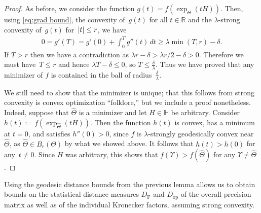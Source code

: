 \documentclass[aos]{imsart}
\theoremstyle{definition}
\numberwithin{equation}{section}
\DeclarePairedDelimiter{\abs}{\lvert}{\rvert}
\newcommand{\R}{{\mathbb{R}}}
\renewcommand{\H}{{\mathbb{H}}}
\newcommand{\htheta}{\widehat{\Theta}}
\newcommand{\DF}{D_{\operatorname{F}}}
\newcommand{\Dop}{D_{\operatorname{op}}}
\begin{document}
\begin{proof}
As before, we consider the function $g(t) = f(\exp_\Theta(tH))$.
Then, using \cref{eq:grad bound}, the convexity of~$g(t)$ for all $t\in\R$ and the $\lambda$-strong convexity of~$g(t)$ for~$\abs t \leq  r$, we have
\begin{align*}
  0 = g'(T) = g'(0) + \int_0^T g''(t) \, dt \geq \lambda \min(T,  r) - \delta.
\end{align*}
If $T> r$ then we have a contradiction as $\lambda r - \delta > \lambda r/2 - \delta > 0$.
Therefore we must have~$T\leq r$ and hence $\lambda T - \delta \leq 0$, so $T \leq \frac\delta\lambda$.
Thus we have proved that any minimizer of $f$ is contained in the ball of radius~$\frac\delta\lambda$.

We still need to show that the minimizer is unique; that this follows from strong convexity is convex optimization ``folklore,'' but we include a proof nonetheless.
Indeed, suppose that $\htheta$ is a minimizer and let $H\in \H$ be arbitrary.
Consider $h(t) := f(\exp_{\htheta}(tH))$.
Then the function $h(t)$ is convex, has a minimum at $t=0$, and satisfies $h''(0) > 0$, since $f$ is $\lambda$-strongly geodesically convex near~$\htheta$, as $\htheta \in B_r(\Theta)$ by what we showed above.
It follows that $h(t) > h(0)$ for any~$t\neq0$.
Since $H$ was arbitrary, this shows that $f(\Upsilon) > f(\htheta)$ for any $\Upsilon\neq \htheta$.
\end{proof}

Using the geodesic distance bounds from the previous lemma allows us to obtain bounds on the statistical distance measures $\DF$ and $\Dop$ of the overall precision matrix as well as of the individual Kronecker factors, assuming strong convexity.
\end{document}
